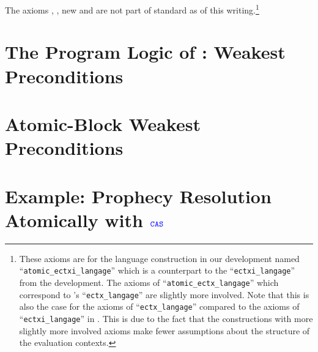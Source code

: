 \documentclass{article}
\begin{document}
The axioms ,
,  new and
are not part of standard \Iris{} as of this writing.\footnote{These
  axioms are for the language construction in our development named
  ``\texttt{atomic\_ectxi\_langage}'' which is a counterpart to the
  ``\texttt{ectxi\_langage}'' from the \Iris{} development. The axioms
  of ``\texttt{atomic\_ectx\_langage}'' which correspond to \Iris{}'s
  ``\texttt{ectx\_langage}'' are slightly more involved. Note that this
  is also the case for the axioms of ``\texttt{ectx\_langage}''
  compared to the axioms of ``\texttt{ectxi\_langage}'' in
  \Iris{}. This is due to the fact that the constructions with more
  slightly more involved axioms make fewer assumptions about the
  structure of the evaluation contexts.}

\section{The Program Logic of \Iris{}: Weakest Preconditions}

\section{Atomic-Block Weakest Preconditions}

\section{Example: Prophecy Resolution Atomically with $\textnormal{\texttt{\color{blue} CAS}}$}
\end{document}
